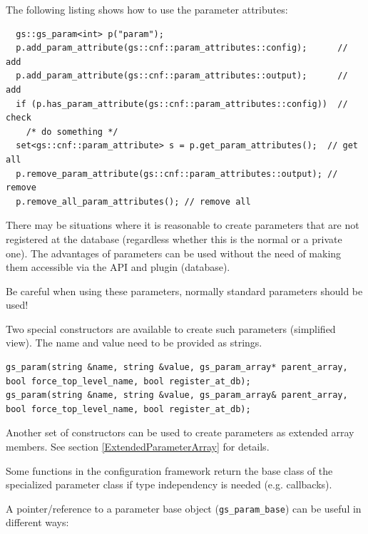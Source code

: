 The following listing shows how to use the parameter attributes:
\begin{lstlisting}
  gs::gs_param<int> p("param");
  p.add_param_attribute(gs::cnf::param_attributes::config);      // add
  p.add_param_attribute(gs::cnf::param_attributes::output);      // add
  if (p.has_param_attribute(gs::cnf::param_attributes::config))  // check
    /* do something */
  set<gs::cnf::param_attribute> s = p.get_param_attributes();  // get all
  p.remove_param_attribute(gs::cnf::param_attributes::output); // remove
  p.remove_all_param_attributes(); // remove all
\end{lstlisting}

There may be situations where it is reasonable to create parameters that are not registered at the database (regardless whether this is the normal or a private one). The advantages of parameters can be used without the need of making them accessible via the API and plugin (database).

\WarningSymbol{} Be careful when using these parameters, normally standard parameters should be used!

Two special constructors are available to create such parameters (simplified view). The name and value need to be provided as strings.
\begin{lstlisting}
gs_param(string &name, string &value, gs_param_array* parent_array,     bool force_top_level_name, bool register_at_db);
gs_param(string &name, string &value, gs_param_array& parent_array,     bool force_top_level_name, bool register_at_db);
\end{lstlisting}


Another set of constructors can be used to create parameters as extended array members. See section \ref{ExtendedParameterArray} for details.

Some functions in the configuration framework return the base class of the specialized parameter class if type independency is needed (e.g. callbacks).

A pointer/reference to a parameter base object (\lstinline|gs_param_base|) can be useful in different ways:

